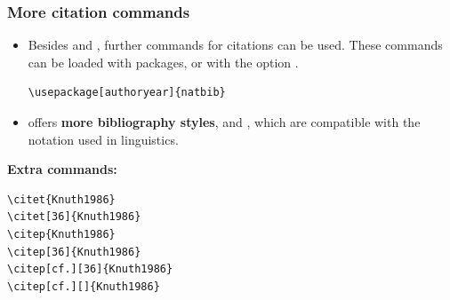 \begin{frame}[fragile]
\frametitle{More citation commands}

\begin{itemize}
	\item Besides  and , further commands for citations can be used. These commands can be loaded with packages, \fe {} or  with the option . 
	
	
\begin{lstlisting}
\usepackage[authoryear]{natbib}
\end{lstlisting}
	
	\item {} offers \textbf{more bibliography styles}, \fe {} and , which are compatible with the  notation used in linguistics.
	
\end{itemize}

\nocite{Daly10a}



%
%
%
%



\textbf{Extra commands:}

\vspace{-.5cm}

\begin{multicols}{2}

\begin{lstlisting}
\citet{Knuth1986}
\citet[36]{Knuth1986}
\citep{Knuth1986}
\citep[36]{Knuth1986}
\citep[cf.][36]{Knuth1986}
\citep[cf.][]{Knuth1986}
\end{lstlisting}


\end{multicols}
\end{frame}
